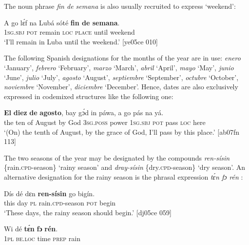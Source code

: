 The  noun phrase \textit{fin de semana} is also usually recruited to express ‘weekend’:


\ea%
    \label{ex:key:1003}
    \gll A    go  lɛ́f    na  Lubá  sóté    \textbf{fin de semana}.\\
\textsc{1sg.sbj}  \textsc{pot}  remain  \textsc{loc}  \textsc{place}  until  weekend\\

\glt ‘I’ll remain in Luba until the weekend.’ [ye05ce 010]
\z

The following Spanish designations for the months of the year are in use: \textit{enero} ‘January’, \textit{febrero} ‘February’, \textit{marzo} ‘March’, \textit{abril} ‘April’, \textit{mayo} ‘May’, \textit{junio} ‘June’, \textit{julio} ‘July’, \textit{agosto} ‘August’, \textit{septiembre} ‘September’, \textit{octubre} ‘October’, \textit{noviembre} ‘November’, \textit{diciembre} ‘December’. Hence, dates are also exclusively expressed in codemixed structures like the following one: 


\ea%
    \label{ex:key:1004}
    \gll \textbf{El}  \textbf{diez}  \textbf{de}  \textbf{agosto},  bay  gɔ́d  in    páwa,  a    go  pás  na  yá.\\
the  ten  of  August  by  God  \textsc{3sg.poss}  power  \textsc{1sg.sbj}  \textsc{pot}  pass  \textsc{loc}  here\\

\glt ‘(On) the tenth of August, by the grace of God, I’ll pass by this place.’ [ab07fn 113]
\z

The two seasons of the year may be designated by the compounds{\fff} \textit{ren-sísin} \{rain.\textsc{cpd}-season\} ‘rainy season’  and \textit{dray-sísin} \{dry.\textsc{cpd}-season\} ‘dry season’. An alternative designation for the rainy season is the phrasal expression \textit{tɛ́n fɔ rén} : 


\ea%
    \label{ex:key:1005}
    \gll Dís  dé  dɛn  \textbf{ren-sísin}    go  bigín.\\
this  day  \textsc{pl}  rain.\textsc{cpd}{}-season  \textsc{pot}  begin\\

\glt ‘These days, the rainy season should begin.’ [dj05ce 059]
\z


\ea%
    \label{ex:key:1006}
    \gll Wi  dé    \textbf{tɛ́n}    \textbf{fɔ}  \textbf{rén}.\\
\textsc{1pl}  \textsc{be.loc}  time    \textsc{prep}  rain\\

